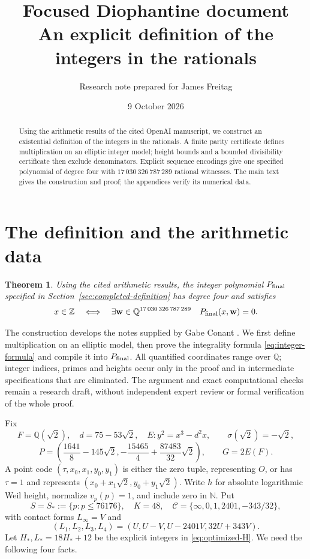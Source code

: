 \documentclass[11pt]{article}
\title{Focused Diophantine document\\\large An explicit definition of the integers in the rationals}
\author{Research note prepared for James Freitag}
\date{9 October 2026}
\newtheorem{theorem}{Theorem}[section]
\theoremstyle{definition}
\newcommand{\Q}{\mathbb Q}\newcommand{\Z}{\mathbb Z}
\newcommand{\N}{\mathbb N}\newcommand{\F}{\mathbb F}
\begin{document}
\maketitle
\begin{abstract}
Using the arithmetic results of the cited OpenAI manuscript, we construct
an existential definition of the integers in the rationals. A finite
parity certificate defines multiplication on an elliptic integer model;
height bounds and a bounded divisibility certificate then exclude
denominators. Explicit sequence encodings give one specified polynomial
of degree four with \(17\,030\,326\,787\,289\) rational witnesses. The main text
gives the construction and proof; the appendices verify its numerical data.
\end{abstract}

\section{The definition and the arithmetic data}\label{sec:inputs}
\label{sec:dependency-status}
\begin{theorem}\label{thm:main}
Using the cited arithmetic results, the integer polynomial
\(P_{\rm final}\) specified in Section~\ref{sec:completed-definition}
has degree four and satisfies
\[
 x\in\Z\quad\Longleftrightarrow\quad
 \exists\mathbf w\in\Q^{17\,030\,326\,787\,289}\quad
                         P_{\rm final}(x,\mathbf w)=0.
\]
\end{theorem}

The construction develops the notes supplied by Gabe Conant
\cite{Conant,ConantArity}. We first define multiplication on an elliptic
model, then prove the integrality formula \eqref{eq:integer-formula}
and compile it into \(P_{\rm final}\). All quantified coordinates
range over \(\Q\); integer indices, primes and heights occur only
in the proof and in intermediate specifications that are eliminated.
The argument and exact computational checks remain a research draft,
without independent expert review or formal verification of the whole proof.

Fix
\[
 F=\Q(\sqrt2),\quad d=75-53\sqrt2,\quad E:y^2=x^3-d^2x,
 \qquad \sigma(\sqrt2)=-\sqrt2,
\]
\[
 P=\left(\frac{1641}{8}-145\sqrt2,
          -\frac{15465}{4}+\frac{87483}{32}\sqrt2\right),
 \qquad G=2E(F).
\]
A point code \((\tau,x_0,x_1,y_0,y_1)\) is either the zero
tuple, representing \(O\), or has \(\tau=1\) and represents
\((x_0+x_1\sqrt2,y_0+y_1\sqrt2)\). Write \(h\) for absolute
logarithmic Weil height, normalize \(v_p(p)=1\), and include zero
in \(\N\). Put
\[
 S=S_*:=\{p:p\le76176\},\quad K=48,\quad
 \mathcal C=\{\infty,0,1,2401,-343/32\},
\]
with contact forms \(L_\infty=V\) and
\[
 (L_1,L_2,L_3,L_4)=(U,U-V,U-2401V,32U+343V).
\]
Let \(H_*,L_*=18H_*+12\) be the explicit integers in
\eqref{eq:optimized-H}. We need the following four facts.
\end{document}
